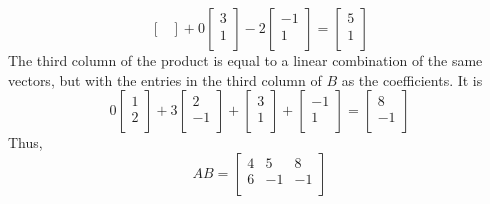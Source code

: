 \documentclass{article}
\begin{document}
\begin{examples}
\[\begin{bmatrix}
    \end{bmatrix} + 0
    \begin{bmatrix}
      3\\
      1\\
    \end{bmatrix} - 2
    \begin{bmatrix}
      -1\\
      1\\
    \end{bmatrix}
    =
    \begin{bmatrix}
      5\\
      1\\
    \end{bmatrix}
  \]
  The third column of the product is equal to a linear combination of the same vectors, but with the entries in the third column of $B$ as the coefficients. It is
  \[
    0
    \begin{bmatrix}
      1\\
      2\\
    \end{bmatrix} + 3
    \begin{bmatrix}
      2\\
      -1\\
    \end{bmatrix} +
    \begin{bmatrix}
      3\\
      1\\
    \end{bmatrix} +
    \begin{bmatrix}
      -1\\
      1\\
    \end{bmatrix}
    =
    \begin{bmatrix}
      8\\
      -1\\
    \end{bmatrix}
  \]
  Thus,
  \[ AB =
    \begin{bmatrix}
      4 & 5 & 8\\
      6 & - 1 & -1\\
  \end{bmatrix}\]
\end{examples}
\end{document}
